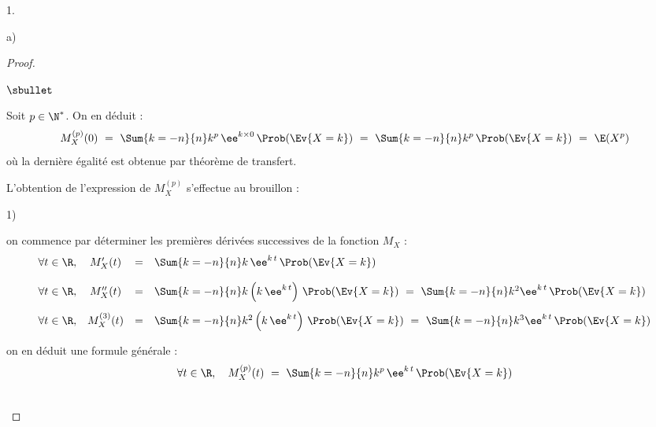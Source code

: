 \documentclass[11pt]{article}%
\begin{document}
\begin{noliste}{1.}
\begin{noliste}{a)}
\begin{proof}
\begin{noliste}{$\sbullet$}
      \item Soit $p \in \N^*$. On en déduit :
        \[
          M_X^{(p)}(0) \ = \ \Sum{k=-n}{n} k^p \, \ee^{k \times 0} \,
          \Prob(\Ev{X = k}) \ = \ \Sum{k=-n}{n} k^p \, \Prob(\Ev{X =
            k}) \ = \ \E(X^p)
        \]
        où la dernière égalité est obtenue par théorème de transfert.
      \end{noliste}


      \newpage

      
      \begin{remark}
        L'obtention de l'expression de $M_X^{(p)}$ s'effectue au
        brouillon :
        \begin{noliste}{\scriptsize 1)}
        \item on commence par déterminer les premières dérivées
          successives de la fonction $M_X$ :
          \[
            \begin{array}{lccl}
              \forall t \in \R, &  M_X'(t) & = & \Sum{k=-n}{n} k \,
              \ee^{k \, t} \, \Prob(\Ev{X = k})
              \\[.4cm]
              \forall t \in \R, &  M_X''(t) & = & \Sum{k=-n}{n} k \left(
              k \, \ee^{k \, t}\right) \, \Prob(\Ev{X = k}) \ = \
              \Sum{k=-n}{n} k^2 \ee^{k \, t} \, \Prob(\Ev{X = k})
              \\[.4cm]
              \forall t \in \R, &  M_X^{(3)}(t) & = & \Sum{k=-n}{n} k^2
              \left(k \, \ee^{k \, t}\right) \, \Prob(\Ev{X = k}) \ = \
              \Sum{k=-n}{n} k^3 \ee^{k \, t} \, \Prob(\Ev{X = k})
            \end{array}
          \]
          
        \item on en déduit une formule générale :
          \[
            \forall t \in \R, \quad
            M_X^{(p)}(t) \ = \ \Sum{k=-n}{n} k^p \, \ee^{k \, t} \,
            \Prob(\Ev{X = k})
          \]
        \end{noliste}
      \end{remark}~\\[-1.4cm]
    \end{proof}
    

\end{noliste}
\end{noliste}
\end{document}
